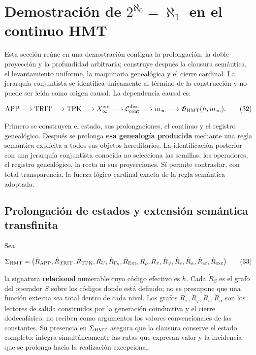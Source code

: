 \section{Demostración de \texorpdfstring{\(2^{\aleph_0}=\aleph_1\)}{2 elevado a aleph cero igual a aleph uno} en el continuo HMT}
\label{sec:cierre-cardinal-nativo}

Esta sección reúne en una demostración contigua la prolongación, la doble
proyección y la profundidad arbitraria; construye después la clausura
semántica, el levantamiento uniforme, la maquinaria genealógica y el cierre
cardinal. La jerarquía conjuntista se identifica únicamente al término de la
construcción y no puede ser leída como origen causal. La dependencia causal es:

\[
 \mathrm{APP}\longrightarrow\mathrm{TRIT}\longrightarrow\mathrm{TPK}
 \longrightarrow X_\infty^{\rm enr}
 \longrightarrow\mathcal C_{\rm cont}^{\rm disc}
 \longrightarrow m_\infty
 \longrightarrow\mathfrak G_{\rm HMT}(h,m_\infty).
\tag{32}\label{eq:ch-cadena-causal}
\]

Primero se construyen el estado, sus prolongaciones, el continuo y el registro genealógico.
Después se prolonga \textbf{esa genealogía producida} mediante una regla semántica
explícita a todos sus objetos hereditarios. La identificación posterior con
una jerarquía conjuntista conocida no selecciona las semillas, los operadores,
el registro genealógico, la recta ni sus proyecciones. Sí permite contrastar, con total
transparencia, la fuerza lógico-cardinal exacta de la regla semántica adoptada.

\subsection{Prolongación de estados y extensión semántica transfinita}

Sea

\[
 \Sigma_{\rm HMT}
 =\bigl(\dot R_{\rm APP},\dot R_{\rm TRIT},\dot R_{\rm TPK},
 \dot R_{U},\dot R_{\Gamma_9},\dot R_{\rm Ext},\dot R_\rho,
 \dot R_{\pi},\dot R_{\varphi},\dot R_e,\dot R_{\alpha},
 \dot R_{\rm ar},\dot R_{\rm exc}\bigr)
\tag{33}\label{eq:ch-signatura}
\]

la signatura \textbf{relacional} numerable cuyo código efectivo es \(h\). Cada
\(\dot R_S\) es el grafo del operador \(S\) sobre los códigos donde está
definido; no se presupone que una función externa sea total dentro de cada
nivel. Los grafos \(\dot R_{\pi},\dot R_{\varphi},\dot R_e,\dot R_{\alpha}\)
son los lectores de salida construidos por la generación coinductiva y el
cierre dodecafásico; no reciben como argumentos los valores convencionales de
las constantes. Su presencia en \(\Sigma_{\rm HMT}\) asegura que la clausura
conserve el estado completo: integra simultáneamente las rutas que expresan
valor y la incidencia que se prolonga hacia la realización excepcional.

